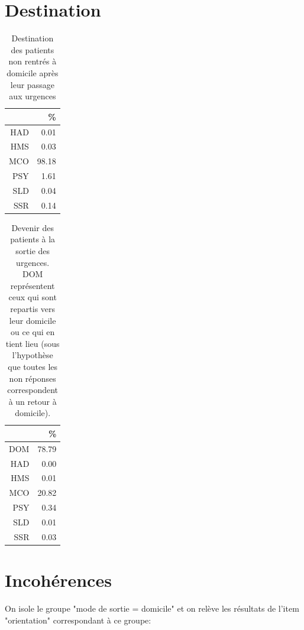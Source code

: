 \documentclass[12pt,english,french,twoside]{book}\usepackage[]{graphicx}\usepackage[]{color}
\begin{document}
\section{Destination}
\begin{table}[ht]
\centering
\begin{tabular}{rr}
  \hline
 & \% \\ 
  \hline
HAD & 0.01 \\ 
  HMS & 0.03 \\ 
  MCO & 98.18 \\ 
  PSY & 1.61 \\ 
  SLD & 0.04 \\ 
  SSR & 0.14 \\ 
   \hline
\end{tabular}
\caption{Destination des patients non rentrés à domicile après leur passage aux urgences} 
\label{tab.dest.hosp}
\end{table}
\begin{table}[ht]
\centering
\begin{tabular}{rr}
  \hline
 & \% \\ 
  \hline
DOM & 78.79 \\ 
  HAD & 0.00 \\ 
  HMS & 0.01 \\ 
  MCO & 20.82 \\ 
  PSY & 0.34 \\ 
  SLD & 0.01 \\ 
  SSR & 0.03 \\ 
   \hline
\end{tabular}
\caption{Devenir des patients à la sortie des urgences. DOM représentent ceux qui sont repartis vers leur domicile ou ce qui en tient lieu (sous l'hypothèse que toutes les non réponses correspondent à un retour à domicile).} 
\label{tab.dest}
\end{table}


\section{Incohérences}


On isole le groupe "mode de sortie = domicile" et on relève les résultats de l'item "orientation" correspondant à ce groupe:
\end{document}
